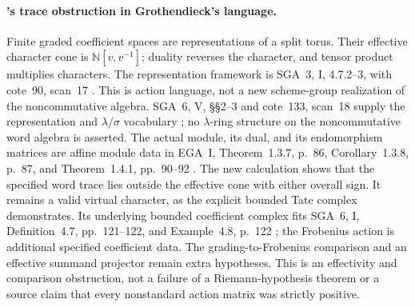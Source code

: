 \paragraph{'s trace obstruction in Grothendieck's language.}
Finite graded coefficient spaces are representations of
a split torus. Their effective character cone is
\(\mathbb N[v,v^{-1}]\); duality reverses the character,
and tensor product multiplies characters.
The representation framework is SGA~3,
I, 4.7.2--3, with cote~90, scan~17 \cite{SGA3,Archive}.
This is action language, not a new scheme-group realization
of the noncommutative algebra.
SGA~6, V, \S\S2--3 and cote~133, scan~18 supply the
representation and \(\lambda/\sigma\) vocabulary
\cite{SGA6,Archive}; no \(\lambda\)-ring structure on the
noncommutative word algebra is asserted.
The actual module, its dual, and its endomorphism matrices
are affine module data in EGA~I, Theorem~1.3.7, p.~86,
Corollary~1.3.8, p.~87, and Theorem~1.4.1,
pp.~90--92 \cite{EGA}.
The new calculation shows that the specified word trace
lies outside the effective cone with either overall sign.
It remains a valid virtual character, as the explicit
bounded Tate complex demonstrates. Its underlying bounded
coefficient complex fits SGA~6, I, Definition~4.7,
pp.~121--122, and Example~4.8, p.~122 \cite{SGA6};
the Frobenius action is additional specified coefficient data.
The grading-to-Frobenius comparison and an effective
summand projector remain extra hypotheses.
This is an effectivity
and comparison obstruction, not a failure of a
Riemann-hypothesis theorem or a source claim that every
nonstandard action matrix was strictly positive.
